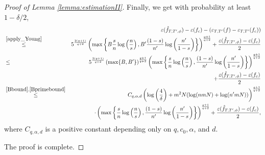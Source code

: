 \documentclass[10pt,a4paper]{amsart}
\begin{document}
\begin{proof}[Proof of Lemma \ref{lemma:estimationII}]
Finally, we get with probability at least $1-\delta/2$,
\begin{eqnarray*}
    &&  \varepsilon (\Hat{f}_{T, T^\prime,\phi}) - \varepsilon (f_c) - \left(\varepsilon_{T, T'} (f) - \varepsilon_{T, T'} (f_c)\right)\\ 
    &\stackrel{\eqref{apply_Young}}{\leq}&  5^{\frac{2(q+1)}{q+2}}  \left(  \max\left\{ B \frac{s}{n}
    \log \left(\frac{n}{s}\right), B^\prime \frac{(1-s)}{n^\prime}\log \left(\frac{n^\prime}{1-s}\right) \right\} \right)^{\frac{q+1}{q+2}} + \frac{\varepsilon (\Hat{f}_{T, T^\prime,\phi}) - \varepsilon (f_c)}{2} \\
 &\leq&  5^{\frac{2(q+1)}{q+2}}  \left(\max\{B, B^\prime\}\right)^{\frac{q+1}{q+2}}\left(  \max\left\{  \frac{s}{n}
\log \left(\frac{n}{s}\right), \frac{(1-s)}{n^\prime}\log \left(\frac{n^\prime}{1-s}\right) \right\} \right)^{\frac{q+1}{q+2}}\\
&&\qquad\qquad+ \frac{\varepsilon (\Hat{f}_{T, T^\prime,\phi}) - \varepsilon (f_c)}{2} \\
&\stackrel{\eqref{Bbound}, \eqref{Bprimebound}}{\leq}& C_{q,\alpha, d} \left(\log \left(\frac{4}{\delta}\right) + m^2 N (\log(nmN)+\log(n^\prime mN))\right)^{\frac{q+1}{q+2}} \\
&& \cdot \left(  \max\left\{  \frac{s}{n}
\log \left(\frac{n}{s}\right), \frac{(1-s)}{n^\prime}\log \left(\frac{n^\prime}{1-s}\right) \right\} \right)^{\frac{q+1}{q+2}} 
 + \frac{\varepsilon (\Hat{f}_{T, T^\prime,\phi}) - \varepsilon (f_c)}{2}, 
\end{eqnarray*}
where $C_{q,\alpha, d}$ is a positive constant depending only on $q,c_0, \alpha$, and $d$. 

The proof is complete.
\end{proof}
\end{document}
